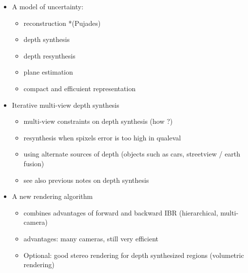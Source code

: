 \begin{itemize}
\item  A model of uncertainty:
\begin{itemize}
\item reconstruction *(Pujades)
\item depth synthesis
\item depth resynthesis
\item plane estimation
\item compact and efficuient representation
\end{itemize}


\item Iterative multi-view depth synthesis
\begin{itemize}
\item multi-view constraints on depth synthesis (how ?)
\item resynthesis when spixels error is too high in qualeval
\item using alternate sources of depth (objects such as cars, streetview / earth fusion)
\item see also previous notes on depth synthesis
\end{itemize}

\item A new rendering algorithm
\begin{itemize}
\item combines advantages of forward and backward IBR (hierarchical, multi-camera)
\item advantages: many cameras, still very efficient
\item  Optional: good stereo rendering for depth synthesized regions (volumetric rendering)
\end{itemize}
\end{itemize}


